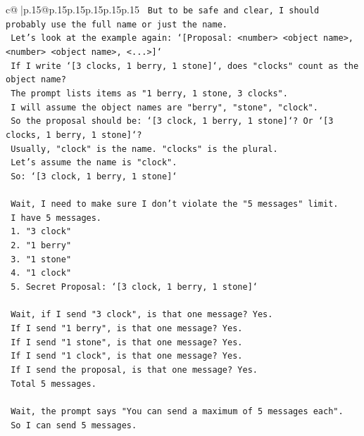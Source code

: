 \documentclass{article}
\begin{document}
{\begin{supertabular}{c@{$\;$}|p{.15\linewidth}@{}p{.15\linewidth}p{.15\linewidth}p{.15\linewidth}p{.15\linewidth}p{.15\linewidth}}
{{{\texttt{    But to be safe and clear, I should probably use the full name or just the name.} \\
\texttt{    Let's look at the example again: `{[}Proposal: <number> <object name>, <number> <object name>, <...>{]}`} \\
\texttt{    If I write `{[}3 clocks, 1 berry, 1 stone{]}`, does "clocks" count as the object name?} \\
\texttt{    The prompt lists items as "1 berry, 1 stone, 3 clocks".} \\
\texttt{    I will assume the object names are "berry", "stone", "clock".} \\
\texttt{    So the proposal should be: `{[}3 clock, 1 berry, 1 stone{]}`? Or `{[}3 clocks, 1 berry, 1 stone{]}`?} \\
\texttt{    Usually, "clock" is the name. "clocks" is the plural.} \\
\texttt{    Let's assume the name is "clock".} \\
\texttt{    So: `{[}3 clock, 1 berry, 1 stone{]}`} \\
\\ 
\texttt{    Wait, I need to make sure I don't violate the "5 messages" limit.} \\
\texttt{    I have 5 messages.} \\
\texttt{    1. "3 clock"} \\
\texttt{    2. "1 berry"} \\
\texttt{    3. "1 stone"} \\
\texttt{    4. "1 clock"} \\
\texttt{    5. Secret Proposal: `{[}3 clock, 1 berry, 1 stone{]}`} \\
\\ 
\texttt{    Wait, if I send "3 clock", is that one message? Yes.} \\
\texttt{    If I send "1 berry", is that one message? Yes.} \\
\texttt{    If I send "1 stone", is that one message? Yes.} \\
\texttt{    If I send "1 clock", is that one message? Yes.} \\
\texttt{    If I send the proposal, is that one message? Yes.} \\
\texttt{    Total 5 messages.} \\
\\ 
\texttt{    Wait, the prompt says "You can send a maximum of 5 messages each".} \\
\texttt{    So I can send 5 messages.} \\
}}}
\end{supertabular}}
\end{document}
